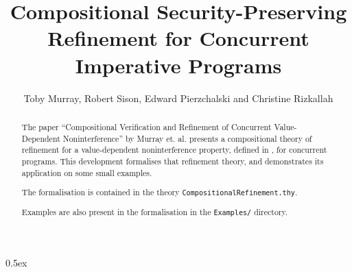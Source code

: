 \documentclass[11pt,a4paper]{article}
\title{Compositional Security-Preserving Refinement for Concurrent Imperative Programs}
\author{Toby Murray, Robert Sison, Edward Pierzchalski and Christine Rizkallah}
\begin{document}
\maketitle
\parindent 0pt\parskip 0.5ex

\begin{abstract}
  The paper ``Compositional Verification and Refinement of Concurrent Value-Dependent 
  Noninterference'' by Murray et. al. \cite{Murray_SPR_16}
  presents a compositional theory of refinement for a value-dependent
  noninterference property, defined in \cite{Murray_15}, for concurrent programs. This development 
  formalises that refinement theory, and demonstrates its application on some small examples. 

The formalisation is contained in the theory \texttt{CompositionalRefinement.thy}.

Examples are also present in the formalisation in the \texttt{Examples/} directory.

\end{abstract}

\tableofcontents





\end{document}
